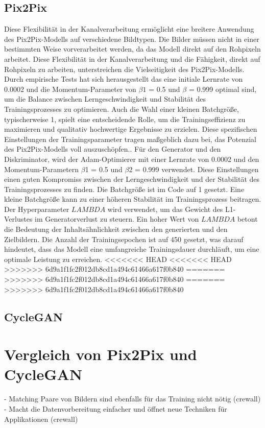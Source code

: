 \subsection{Pix2Pix}
 Diese Flexibilität in der Kanalverarbeitung ermöglicht eine breitere Anwendung des Pix2Pix-Modells auf verschiedene Bildtypen. Die Bilder müssen nicht in einer bestimmten Weise vorverarbeitet werden, da das Modell direkt auf den Rohpixeln arbeitet. Diese Flexibilität in der Kanalverarbeitung und die Fähigkeit, direkt auf Rohpixeln zu arbeiten, unterstreichen die Vielseitigkeit des Pix2Pix-Modells.
  Durch empirische Tests hat sich herausgestellt das eine initiale Lernrate von 0.0002 und die Momentum-Parameter von $\beta1$ = 0.5 und $\beta$ = 0.999 optimal sind, um die Balance zwischen Lerngeschwindigkeit und Stabilität des Trainingsprozesses zu optimieren. Auch die Wahl einer kleinen Batchgröße, typischerweise 1, spielt eine entscheidende Rolle, um die Trainingseffizienz zu maximieren und qualitativ hochwertige Ergebnisse zu erzielen. Diese spezifischen Einstellungen der Trainingsparameter tragen maßgeblich dazu bei, das Potenzial des Pix2Pix-Modells voll auszuschöpfen.\cite{PhillipIsola.}.\newline
  Für den Generator und den Diskriminator, wird der Adam-Optimierer mit einer Lernrate von 0.0002 und den Momentum-Parametern $\beta$1 = 0.5 und $\beta$2 = 0.999 verwendet. Diese Einstellungen einen guten Kompromiss zwischen der Lerngeschwindigkeit und der Stabilität des Trainingsprozesses zu finden. Die Batchgröße ist im Code auf 1 gesetzt. Eine kleine Batchgröße kann zu einer höheren Stabilität im Trainingsprozess beitragen. Der Hyperparameter $LAMBDA$ wird verwendet, um das Gewicht des L1-Verlustes im Generatorverlust zu steuern. Ein hoher Wert von $LAMBDA$ betont die Bedeutung der Inhaltsähnlichkeit zwischen den generierten und den Zielbildern. Die Anzahl der Trainingsepochen ist auf 450 gesetzt, was darauf hindeutet, dass das Modell eine umfangreiche Trainingsdauer durchläuft, um eine optimale Leistung zu erreichen.
<<<<<<< HEAD
<<<<<<< HEAD
>>>>>>> 6d9a1f1fc2f012db8cd1a494c61466a617f0b840
=======
>>>>>>> 6d9a1f1fc2f012db8cd1a494c61466a617f0b840
=======
>>>>>>> 6d9a1f1fc2f012db8cd1a494c61466a617f0b840

\subsection{CycleGAN}

\section{Vergleich von Pix2Pix und CycleGAN}
- Matching Paare von Bildern sind ebenfalls für das Training nicht nötig (crewall)
- Macht die Datenvorbereitung einfacher und öffnet neue Techniken für Applikationen (crewall)